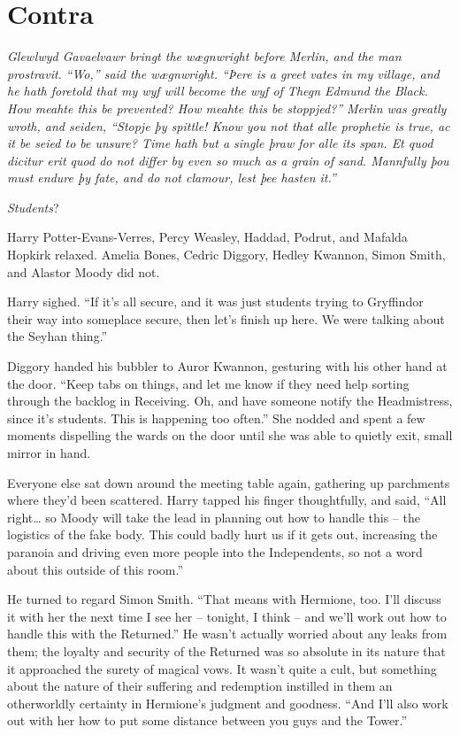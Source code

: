 \hypertarget{contra}{%
\chapter{Contra}\label{contra}}

\emph{Glewlwyd Gavaelvawr bringt the wægnwright before Merlin, and the
man prostravit.} \emph{``Wo,'' said the wægnwright. ``Þere is a greet
vates in my village, and he hath foretold that my wyf will become the
wyf of Thegn Edmund the Black. How meahte this be prevented? How meahte
this be stoppjed?''} \emph{Merlin was greatly wroth, and seiden,
``Stopje þy spittle! Know you not that alle prophetie is true, ac it be
seied to be unsure? Time hath but a single þraw for alle its span. Et
quod dicitur erit quod do not differ by even so much as a grain of sand.
Mannfully þou must endure þy fate, and do not clamour, lest þee hasten
it.''}


\mybreak

\emph{Students}?

Harry Potter-Evans-Verres, Percy Weasley, Haddad, Podrut, and Mafalda
Hopkirk relaxed. Amelia Bones, Cedric Diggory, Hedley Kwannon, Simon
Smith, and Alastor Moody did not.

Harry sighed. ``If it's all secure, and it was just students trying to
Gryffindor their way into someplace secure, then let's finish up here.
We were talking about the Seyhan thing.''

Diggory handed his bubbler to Auror Kwannon, gesturing with his other
hand at the door. ``Keep tabs on things, and let me know if they need
help sorting through the backlog in Receiving. Oh, and have someone
notify the Headmistress, since it's students. This is happening too
often.'' She nodded and spent a few moments dispelling the wards on the
door until she was able to quietly exit, small mirror in hand.

Everyone else sat down around the meeting table again, gathering up
parchments where they'd been scattered. Harry tapped his finger
thoughtfully, and said, ``All right\ldots{} so Moody will take the lead
in planning out how to handle this -- the logistics of the fake body.
This could badly hurt us if it gets out, increasing the paranoia and
driving even more people into the Independents, so not a word about this
outside of this room.''

He turned to regard Simon Smith. ``That means with Hermione, too. I'll
discuss it with her the next time I see her -- tonight, I think -- and
we'll work out how to handle this with the Returned.'' He wasn't
actually worried about any leaks from them; the loyalty and security of
the Returned was so absolute in its nature that it approached the surety
of magical vows. It wasn't quite a cult, but something about the nature
of their suffering and redemption instilled in them an otherworldly
certainty in Hermione's judgment and goodness. ``And I'll also work out
with her how to put some distance between you guys and the Tower.''

